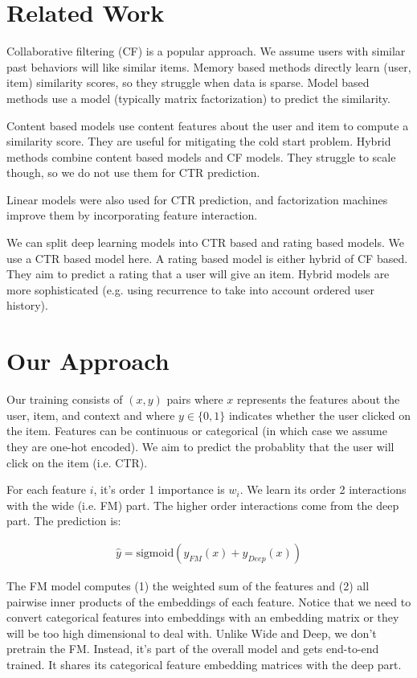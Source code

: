 \documentclass[a4paper]{article}
\begin{document}
\section{Related Work}
Collaborative filtering (CF) is a popular approach. We assume users with similar
past behaviors will like similar items. Memory based methods directly learn
(user, item) similarity scores, so they struggle when data is sparse. Model
based methods use a model (typically matrix factorization) to predict the
similarity.

Content based models use content features about the user and item to compute a
similarity score. They are useful for mitigating the cold start problem.
Hybrid methods combine content based models and CF models. They struggle to
scale though, so we do not use them for CTR prediction.

Linear models were also used for CTR prediction, and factorization machines
improve them by incorporating feature interaction.

We can split deep learning models into CTR based and rating based models. We
use a CTR based model here. A rating based model is either hybrid of CF based.
They aim to predict a rating that a user will give an item. Hybrid models are
more sophisticated (e.g. using recurrence to take into account ordered user
history).

\section{Our Approach}
Our training consists of $(x, y)$ pairs where $x$ represents the features about
the user, item, and context and where $y \in \{0, 1\}$ indicates whether the
user clicked on the item. Features can be continuous or categorical (in which
case we assume they are one-hot encoded). We aim to predict the probablity that
the user will click on the item (i.e. CTR).

For each feature $i$, it's order 1 importance is $w_i$. We learn its order 2
interactions with the wide (i.e. FM) part. The higher order interactions come
from the deep part. The prediction is:

\begin{align}
  \hat{y} = \textrm{sigmoid}(y_{FM}(x) + y_{Deep}(x))
\end{align}

The FM model computes (1) the weighted sum of the features and (2) all pairwise
inner products of the embeddings of each feature. Notice that we need to convert
categorical features into embeddings with an embedding matrix or they will be
too high dimensional to deal with. Unlike Wide and Deep, we don't pretrain
the FM. Instead, it's part of the overall model and gets end-to-end trained.
It shares its categorical feature embedding matrices with the deep part.
\end{document}
